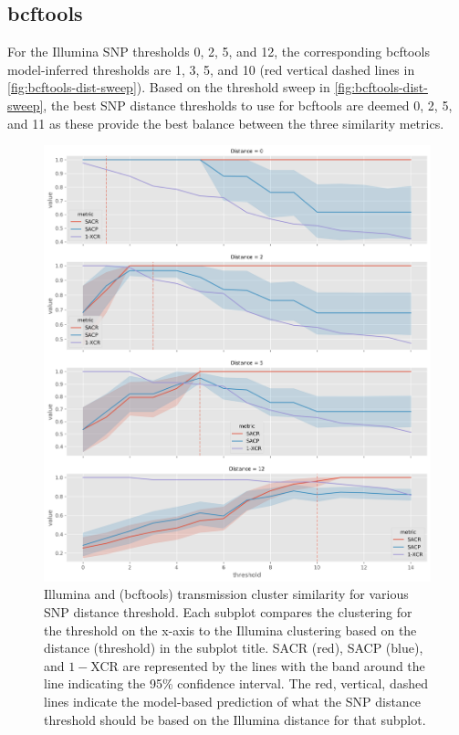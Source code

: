 \subsection{bcftools}

For the Illumina SNP thresholds 0, 2, 5, and 12, the corresponding bcftools model-inferred thresholds are 1, 3, 5, and 10 (red vertical dashed lines in \autoref{fig:bcftools-dist-sweep}). Based on the threshold sweep in \autoref{fig:bcftools-dist-sweep}, the best SNP distance thresholds to use for bcftools are deemed 0, 2, 5, and 11 as these provide the best balance between the three similarity metrics.

\begin{figure}
\begin{center}
\includegraphics[width=0.90\columnwidth]{Appendix1/Figs/bcftools-threshold-sweep.png}
\caption{{Illumina and \ont{} (bcftools) transmission cluster similarity for various SNP distance threshold. Each subplot compares the \ont{} clustering for the threshold on the x-axis to the Illumina clustering based on the distance (threshold) in the subplot title. SACR (red), SACP (blue), and $1-$XCR are represented by the lines with the band around the line indicating the 95\% confidence interval. The red, vertical, dashed lines indicate the model-based prediction of what the \ont{} SNP distance threshold should be based on the Illumina distance for that subplot.
{\label{fig:bcftools-dist-sweep}}%
}}
\end{center}
\end{figure}

